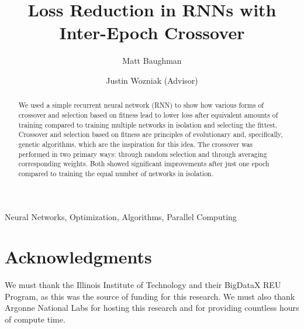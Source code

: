\documentclass[conference]{IEEEtran}
\begin{document}
\title{Loss Reduction in RNNs with Inter-Epoch Crossover}



 \author[*]{Matt Baughman}
 \author[**]{Justin Wozniak (Advisor)}

\maketitle

\begin{abstract}
We used a simple recurrent neural network (RNN) to show how various forms of crossover and selection based on fitness lead to lower loss after equivalent amounts of training compared to training multiple networks in isolation and selecting the fittest. Crossover and selection based on fitness are principles of evolutionary and, specifically, genetic algorithms, which are the inspiration for this idea. The crossover was performed in two primary ways: through random selection and through averaging corresponding weights. Both showed significant improvements after just one epoch compared to training the equal number of networks in isolation.
\end{abstract}

\begin{IEEEkeywords}
Neural Networks, Optimization, Algorithms, Parallel Computing
\end{IEEEkeywords}

\IEEEpeerreviewmaketitle








\section*{Acknowledgments}
We must thank the Illinois Institute of Technology and their BigDataX REU Program, as this was the source of funding for this research. We must also thank Argonne National Labs for hosting this research and for providing countless hours of compute time.

\ifCLASSOPTIONcaptionsoff
  \newpage
\fi
\nocite{*}





\end{document}
